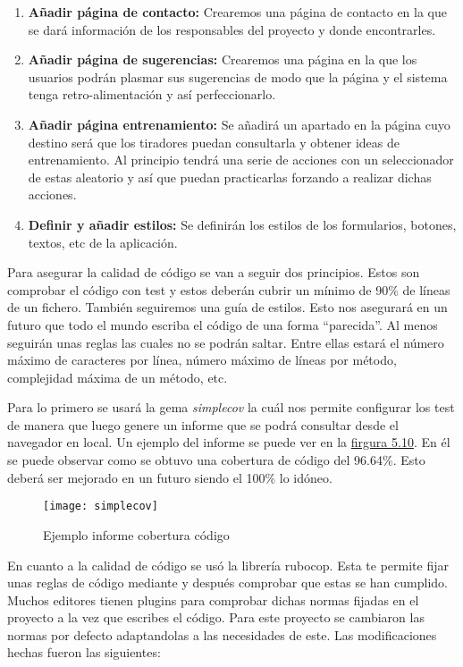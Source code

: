 \begin{enumerate}
  \item \textbf{Añadir página de contacto:} Crearemos una página de contacto en la que
    se dará información de los responsables del proyecto y donde encontrarles.

  \item \textbf{Añadir página de sugerencias:} Crearemos una página en la que los usuarios
    podrán plasmar sus sugerencias de modo que la página y el sistema tenga retro-alimentación
    y así perfeccionarlo.

  \item \textbf{Añadir página entrenamiento:} Se añadirá un apartado en la página cuyo destino
    será que los tiradores puedan consultarla y obtener ideas de entrenamiento. Al principio
    tendrá una serie de acciones con un seleccionador de estas aleatorio y así que puedan
    practicarlas forzando a realizar dichas acciones.

  \item \textbf{Definir y añadir estilos:} Se definirán los estilos de los formularios, botones,
    textos, etc de la aplicación.
\end{enumerate}

Para asegurar la calidad de código se van a seguir dos principios. Estos son comprobar
el código con test y estos deberán cubrir un mínimo de 90\% de líneas de un fichero.
También seguiremos una guía de estilos. Esto nos asegurará en un futuro que todo el mundo
escriba el código de una forma \enquote{parecida}. Al menos seguirán unas reglas las cuales
no se podrán saltar. Entre ellas estará el número máximo de caracteres por línea,
número máximo de líneas por método, complejidad máxima de un método, etc.

Para lo primero se usará la gema \textit{simplecov} la cuál nos permite configurar
los test de manera que luego genere un informe que se podrá consultar desde el navegador
en local. Un ejemplo del informe se puede ver en la \hyperref[fig:Ejemplo informe cobertura código]{firgura 5.10}.
En él se puede observar como se obtuvo una cobertura de código del 96.64\%. Esto deberá ser
mejorado en un futuro siendo el 100\% lo idóneo.

\begin{figure}[htb]
  \centering
  \texttt{[image: simplecov]}
  \caption[Ejemplo informe cobertura código]{Ejemplo informe cobertura código}
  \label{fig:Ejemplo informe cobertura código}
\end{figure}

En cuanto a la calidad de código se usó la librería rubocop. Esta te permite
fijar unas reglas de código mediante y después comprobar que estas se han cumplido.
Muchos editores tienen plugins para comprobar dichas normas fijadas en el proyecto
a la vez que escribes el código. Para este proyecto se cambiaron las normas por defecto
adaptandolas a las necesidades de este. Las modificaciones hechas fueron las siguientes:

